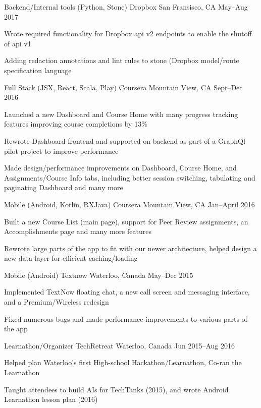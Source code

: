 \begin{cventries}
  \vspace{-1mm}
  \cventry
    {Backend/Internal tools (Python, Stone)} {Dropbox} {San Fransisco, CA} {May--Aug 2017}
    {
      \begin{cvitems}
        \item {Wrote required functionality for Dropbox api v2 endpoints to enable the shutoff of api v1} \item {Adding redaction annotations and lint rules to stone (Dropbox model/route specification language}
      \end{cvitems}
    }
  \cventry
    {Full Stack (JSX, React, Scala, Play)} {Coursera} {Mountain View, CA} {Sept--Dec 2016}
    {
      \begin{cvitems}
        \item {Launched a new Dashboard and Course Home with many progress tracking features improving course completions by 13\%} \item {Rewrote Dashboard frontend and supported on backend as part of a GraphQl pilot project to improve performance} \item {Made design/performance improvements on Dashboard, Course Home, and Assignments/Course Info tabs, including better session switching, tabulating and paginating Dashboard and many more}
      \end{cvitems}
    }
  \cventry
    {Mobile (Android, Kotlin, RXJava)} {Coursera} {Mountain View, CA} {Jan--April 2016}
    {
      \begin{cvitems}
        \item {Built a new Course List (main page), support for Peer Review assignments, an Accomplishments page and many more features} \item {Rewrote large parts of the app to fit with our newer architecture, helped design a new data layer for efficient caching/loading}
      \end{cvitems}
    }
  \cventry
    {Mobile (Android)} {Textnow} {Waterloo, Canada} {May--Dec 2015}
    {
      \begin{cvitems}
        \item {Implemented TextNow floating chat, a new call screen and messaging interface, and a Premium/Wireless redesign} \item {Fixed numerous bugs and made performance improvements to various parts of the app}
      \end{cvitems}
    }
  \cventry
    {Learnathon/Organizer} {TechRetreat} {Waterloo, Canada} {Jun 2015--Aug 2016}
    {
      \begin{cvitems}
        \item {Helped plan Waterloo’s first High-school Hackathon/Learnathon, Co-ran the Learnathon} \item {Taught attendees to build AIs for TechTanks (2015), and wrote Android Learnathon lesson plan (2016)}
      \end{cvitems}
    }
  \vspace{-1mm}
\end{cventries}